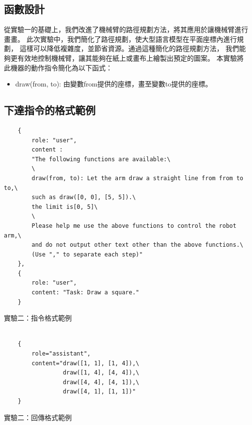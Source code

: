 \documentclass[class=NCU_thesis, crop=false]{standalone}
\begin{document}
\subsection{函數設計}
從實驗一的基礎上，我們改進了機械臂的路徑規劃方法，將其應用於讓機械臂進行畫畫。
此次實驗中，我們簡化了路徑規劃，使大型語言模型在平面座標內進行規劃，
這樣可以降低複雜度，並節省資源。通過這種簡化的路徑規劃方法，
我們能夠更有效地控制機械臂，讓其能夠在紙上或畫布上繪製出預定的圖案。
本實驗將此機器的動作指令簡化為以下函式：

\begin{itemize}
    \item draw(from, to): 由變數from提供的座標，畫至變數to提供的座標。
\end{itemize}

\subsection{下達指令的格式範例}
\begin{listing}
    \begin{verbatim}
    {     
        role: "user",
        content : 
        "The following functions are available:\
        \
        draw(from, to): Let the arm draw a straight line from from to to,\
        such as draw([0, 0], [5, 5]).\
        the limit is[0, 5]\
        \
        Please help me use the above functions to control the robot arm,\
        and do not output other text other than the above functions.\
        (Use "," to separate each step)"
    },
    {
        role: "user", 
        content: "Task: Draw a square."
    }
    \end{verbatim}
\caption{實驗二：指令格式範例} 
\end{listing}

\begin{listing}
    \begin{verbatim}

    {
        role="assistant",
        content="draw([1, 1], [1, 4]),\
                 draw([1, 4], [4, 4]),\
                 draw([4, 4], [4, 1]),\
                 draw([4, 1], [1, 1])"
    }

    \end{verbatim}
\caption{實驗二：回傳格式範例} 
\end{listing}
\end{document}
